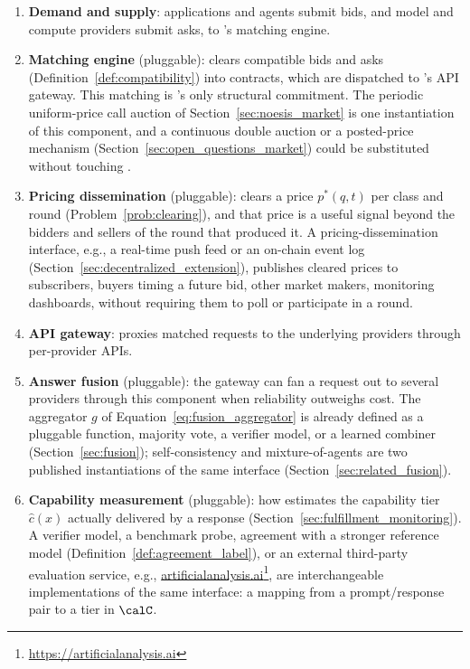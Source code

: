 \begin{enumerate}
  \item \textbf{Demand and supply}: applications and agents submit bids, and
    model and compute providers submit asks, to \NoesisMarket{}'s matching
    engine.

  \item \textbf{Matching engine} (pluggable): clears compatible bids and asks
    (Definition~\ref{def:compatibility}) into contracts, which are dispatched
    to \NoesisServer{}'s API gateway. This matching is \NoesisMarket's only
    structural commitment. The periodic uniform-price call auction of
    Section~\ref{sec:noesis_market} is one instantiation of this component,
    and a continuous double auction or a posted-price mechanism
    (Section~\ref{sec:open_questions_market}) could be substituted without
    touching \NoesisServer.

  \item \textbf{Pricing dissemination} (pluggable): \NoesisMarket{} clears a
    price $p^*(q, t)$ per class and round (Problem~\ref{prob:clearing}), and
    that price is a useful signal beyond the bidders and sellers of the round
    that produced it. A pricing-dissemination interface, e.g., a real-time
    push feed or an on-chain event log
    (Section~\ref{sec:decentralized_extension}), publishes cleared prices to
    subscribers, buyers timing a future bid, other market makers, monitoring
    dashboards, without requiring them to poll \NoesisMarket{} or participate
    in a round.

  \item \textbf{API gateway}: proxies matched requests to the underlying
    providers through per-provider APIs.

  \item \textbf{Answer fusion} (pluggable): the gateway can fan a request out
    to several providers through this component when reliability outweighs
    cost. The aggregator $g$ of Equation~\eqref{eq:fusion_aggregator} is
    already defined as a pluggable function, majority vote, a verifier model,
    or a learned combiner (Section~\ref{sec:fusion}); self-consistency
    \cite{wang2022selfconsistency} and mixture-of-agents \cite{wang2024moa}
    are two published instantiations of the same interface
    (Section~\ref{sec:related_fusion}).

  \item \textbf{Capability measurement} (pluggable): how \NoesisServer{}
    estimates the capability tier $\hat c(x)$ actually delivered by a response
    (Section~\ref{sec:fulfillment_monitoring}). A verifier model, a benchmark
    probe, agreement with a stronger reference model
    (Definition~\ref{def:agreement_label}), or an external third-party
    evaluation service, e.g.,
    \href{https://artificialanalysis.ai}{artificialanalysis.ai}\footnote{\url{https://artificialanalysis.ai}}, are
    interchangeable implementations of the same interface: a mapping from a
    prompt/response pair to a tier in $\calC$.


\end{enumerate}
